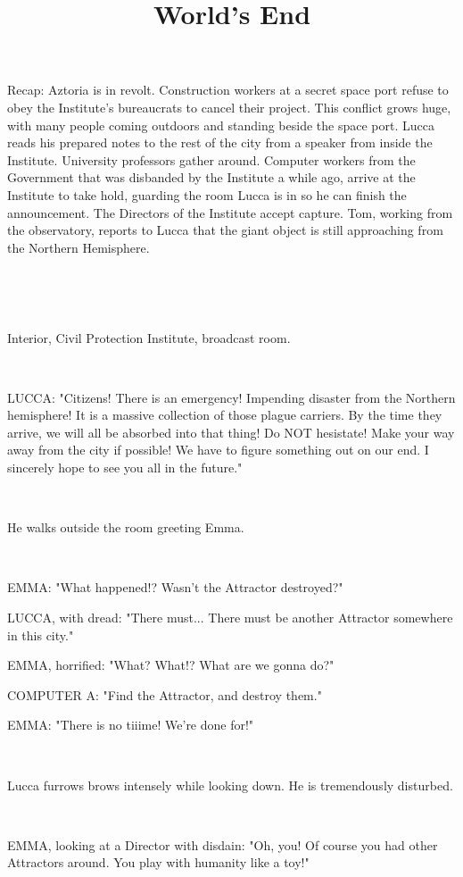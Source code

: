 \documentclass[11pt]{article}
\begin{document}
\ttfamily
\title{World's End}
\maketitle


Recap: Aztoria is in revolt. 
Construction workers at a secret space port refuse to obey the Institute's bureaucrats to cancel their project.
This conflict grows huge, with many people coming outdoors and standing beside the space port.
Lucca reads his prepared notes to the rest of the city from a speaker from inside the Institute.
University professors gather around.
Computer workers from the Government that was disbanded by the Institute a while ago, arrive at the Institute to take hold, guarding the room Lucca is in so he can finish the announcement.
The Directors of the Institute accept capture.
Tom, working from the observatory, reports to Lucca that the giant object is still approaching from the Northern Hemisphere. 

\ 

\ 

Interior, Civil Protection Institute, broadcast room. 

\ 

LUCCA: "Citizens! There is an emergency! 
Impending disaster from the Northern hemisphere!
It is a massive collection of those plague carriers.
By the time they arrive, we will all be absorbed into that thing!
Do NOT hesistate!
Make your way away from the city if possible!
We have to figure something out on our end.
I sincerely hope to see you all in the future."

\ 

He walks outside the room greeting Emma. 

\ 

EMMA: "What happened!?
Wasn't the Attractor destroyed?"

LUCCA, with dread: "There must...
There must be another Attractor somewhere in this city."

EMMA, horrified: "What? What!? What are we gonna do?"

COMPUTER A: "Find the Attractor, and destroy them."

EMMA: "There is no tiiime! We're done for!"

\ 

Lucca furrows brows intensely while looking down. 
He is tremendously disturbed.

\ 

EMMA, looking at a Director with disdain: "Oh, you! 
Of course you had other Attractors around.
You play with humanity like a toy!"
\end{document}
